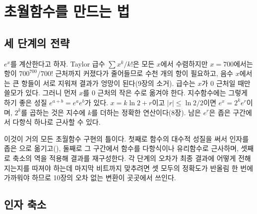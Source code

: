 \chapter{초월함수를 만드는 법}
\label{ch:elementary-functions}


\section{세 단계의 전략}
\label{sec:three-steps}

$e^x$를 계산한다고 하자. Taylor 급수 $\sum x^k/k!$은 모든 $x$에서 수렴하지만 $x=700$에서는 항이 $700^{700}/700!$ 근처까지 커졌다가 줄어들므로 수천 개의 항이 필요하고, 음수 $x$에서는 큰 항들이 서로 지워져 결과가 엉망이 된다(9장의 소거). 급수는 $x$가 $0$ 근처일 때만 쓸모가 있다. 그러니 먼저 $x$를 $0$ 근처의 작은 수로 옮겨야 한다. 지수함수에는 그렇게 하기 좋은 성질 $e^{a+b}=e^ae^b$가 있다. $x=k\ln2+r$이고 $|r|\le\ln2/2$이면 $e^x=2^ke^r$이며, $2^k$를 곱하는 것은 지수에 $k$를 더하는 정확한 연산이다(8장). 남은 $e^r$은 좁은 구간에서 다항식 하나로 근사할 수 있다.

이것이 거의 모든 초월함수 구현의 틀이다. 첫째로 함수의 대수적 성질을 써서 인자를 좁은 으로 옮기고(), 둘째로 그 구간에서 함수를 다항식이나 유리함수로 근사하며, 셋째로 축소의 역을 적용해 결과를 재구성한다. 각 단계의 오차가 최종 결과에 어떻게 전해지는지를 따져야 하는데 마지막 비트까지 맞추려면 셋 모두의 정확도가 반올림 한 번에 가까워야 하므로 10장의 오차 없는 변환이 곳곳에서 쓰인다.

\section{인자 축소}
\label{sec:reduction}

